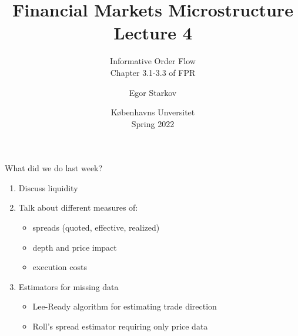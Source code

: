 \documentclass[english,10pt
,aspectratio=169
]{beamer}
\title{Financial Markets Microstructure \\ Lecture 4}
\subtitle{Informative Order Flow\\
	Chapter 3.1-3.3 of FPR}
\author{Egor Starkov}
\date{K{\o}benhavns Unversitet \\
	Spring 2022}
\begin{document}
\frame[plain]{\titlepage}


\begin{frame}{What did we do last week?}
\begin{enumerate}
	\item Discuss liquidity
	\item Talk about different measures of:
	\begin{itemize}
		\item spreads (quoted, effective, realized)
		\item depth and price impact
		\item execution costs
	\end{itemize}
	\item Estimators for missing data
	\begin{itemize}
		\item Lee-Ready algorithm for estimating trade direction
		\item Roll's spread estimator requiring only price data
	\end{itemize}
\end{enumerate}
\end{frame}


\end{document}
